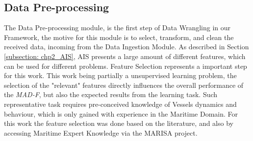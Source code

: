 







\subsection{Data Pre-processing}
\label{subsection: 3 Pre-processing}
The Data Pre-processing module, is the first step of Data Wrangling in our Framework, the motive for this module is to select, transform, and clean the received data, incoming from the Data Ingestion Module. 
As described in Section \ref{subsection: chp2_AIS}, AIS presents a large amount of different features, which can be used for different problems. Feature Selection represents a important step for this work. This work being partially a unsupervised learning problem, the selection of the "relevant" features directly influences the overall performance of the \emph{MAD-F}, but also the expected results from the learning task. Such representative task requires pre-conceived knowledge of Vessels dynamics and behaviour, which is only gained with experience in the Maritime Domain. For this work the feature selection was done based on the literature, and also by accessing Maritime Expert Knowledge via the MARISA project.

